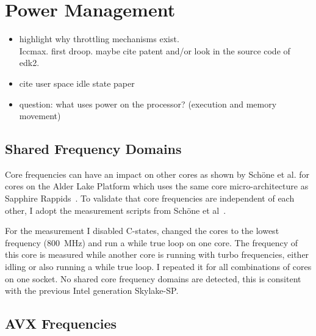 \chapter{Power Management}

\begin{itemize}
    \item highlight why throttling mechanisms exist.\\
    Iccmax. first droop. maybe cite patent and/or look in the source code of edk2.
    \item cite user space idle state paper
    \item question: what uses power on the processor? (execution and memory movement)
\end{itemize}

\section{Shared Frequency Domains}
Core frequencies can have an impact on other cores as shown by Schöne et al. for cores on the Alder Lake Platform which uses the same core micro-architecture as Sapphire Rappids~\cite{Schoene_2024_Alder_Lake}.
To validate that core frequencies are independent of each other, I adopt the measurement scripts from Sch\"one et al~\cite{Schoene_2024_Alder_Lake}.

For the measurement I disabled C-states, changed the cores to the lowest frequency (\SI{800}{\MHz}) and run a while true loop on one core.
The frequency of this core is measured while another core is running with turbo frequencies, either idling or also running a while true loop.
I repeated it for all combinations of cores on one socket.
No shared core frequency domains are detected, this is consitent with the previous Intel generation Skylake-SP.

\section{AVX Frequencies}
\label{sec:avx-frequencies}

